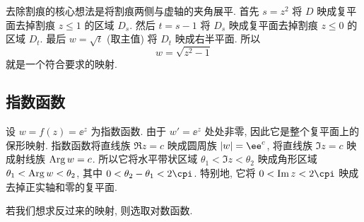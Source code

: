 \begin{solution}
  去除割痕的核心想法是将割痕两侧与虚轴的夹角展平.
  首先 $s=z^2$ 将 $D$ 映成复平面去掉割痕 $z\le 1$ 的区域 $D_s$.
  然后 $t=s-1$ 将 $D_s$ 映成复平面去掉割痕 $z\le 0$ 的区域 $D_t$.
  最后 $w=\sqrt t$ (取主值) 将 $D_t$ 映成右半平面.
  所以
  \[
    w=\sqrt{z^2-1}
  \]
  就是一个符合要求的映射.
\end{solution}


\subsection{指数函数}

设 $w=f(z)=\ee^z$ 为指数函数.
由于 $w'=\ee^z$ 处处非零, 因此它是整个复平面上的保形映射.
指数函数将直线族 $\Re z=c$ 映成圆周族 $\abs{w}=\ee^c$, 将直线族 $\Im z=c$ 映成射线族 $\operatorname{Arg} w=c$.
所以它将水平带状区域 $\theta_1<\Im z<\theta_2$ 映成角形区域 $\theta_1<\operatorname{Arg} w<\theta_2$, 其中 $0<\theta_2-\theta_1<2\cpi$.
特别地, 它将 $0<\Im z<2\cpi$ 映成去掉正实轴和零的复平面.

若我们想求反过来的映射, 则选取对数函数.

